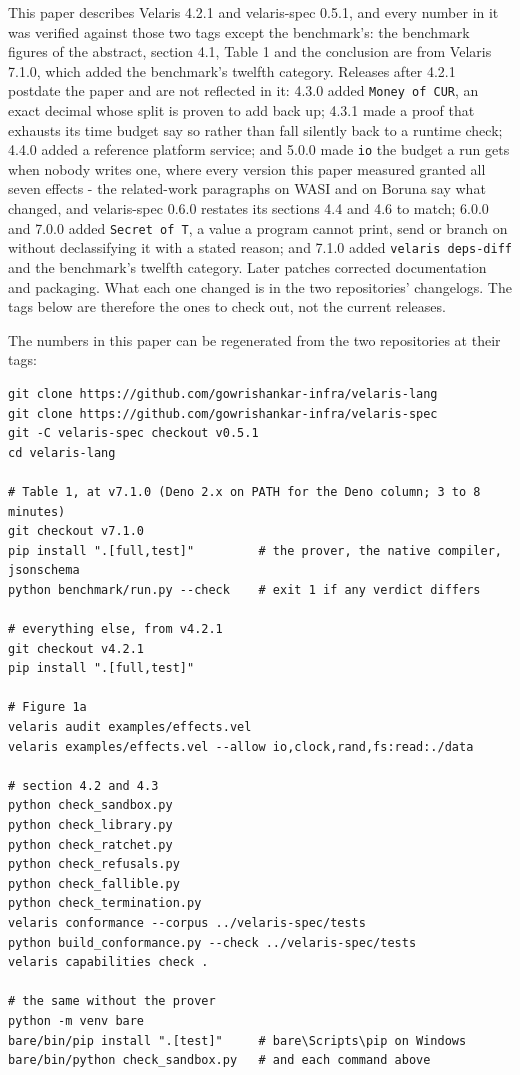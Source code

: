 \documentclass[
]{article}
\begin{document}
This paper describes Velaris 4.2.1 and velaris-spec 0.5.1, and every
number in it was verified against those two tags except the benchmark's:
the benchmark figures of the abstract, section 4.1, Table 1 and the
conclusion are from Velaris 7.1.0, which added the benchmark's twelfth
category. Releases after 4.2.1 postdate the paper and are not reflected
in it: 4.3.0 added \texttt{Money\ of\ CUR}, an exact decimal whose split
is proven to add back up; 4.3.1 made a proof that exhausts its time
budget say so rather than fall silently back to a runtime check; 4.4.0
added a reference platform service; and 5.0.0 made \texttt{io} the
budget a run gets when nobody writes one, where every version this paper
measured granted all seven effects - the related-work paragraphs on WASI
and on Boruna say what changed, and velaris-spec 0.6.0 restates its
sections 4.4 and 4.6 to match; 6.0.0 and 7.0.0 added
\texttt{Secret\ of\ T}, a value a program cannot print, send or branch
on without declassifying it with a stated reason; and 7.1.0 added
\texttt{velaris\ deps-diff} and the benchmark's twelfth category. Later
patches corrected documentation and packaging. What each one changed is
in the two repositories' changelogs. The tags below are therefore the
ones to check out, not the current releases.

The numbers in this paper can be regenerated from the two repositories
at their tags:

\begin{verbatim}
git clone https://github.com/gowrishankar-infra/velaris-lang
git clone https://github.com/gowrishankar-infra/velaris-spec
git -C velaris-spec checkout v0.5.1
cd velaris-lang

# Table 1, at v7.1.0 (Deno 2.x on PATH for the Deno column; 3 to 8 minutes)
git checkout v7.1.0
pip install ".[full,test]"         # the prover, the native compiler, jsonschema
python benchmark/run.py --check    # exit 1 if any verdict differs

# everything else, from v4.2.1
git checkout v4.2.1
pip install ".[full,test]"

# Figure 1a
velaris audit examples/effects.vel
velaris examples/effects.vel --allow io,clock,rand,fs:read:./data

# section 4.2 and 4.3
python check_sandbox.py
python check_library.py
python check_ratchet.py
python check_refusals.py
python check_fallible.py
python check_termination.py
velaris conformance --corpus ../velaris-spec/tests
python build_conformance.py --check ../velaris-spec/tests
velaris capabilities check .

# the same without the prover
python -m venv bare
bare/bin/pip install ".[test]"     # bare\Scripts\pip on Windows
bare/bin/python check_sandbox.py   # and each command above
\end{verbatim}
\end{document}
